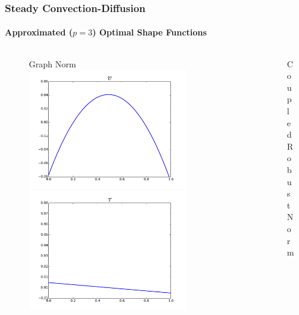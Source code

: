 \documentclass[18pt,xcolor=table]{beamer}
\begin{document}
\begin{frame}[t]
\frametitle{Steady Convection-Diffusion}
\framesubtitle{Approximated ($p=3$) Optimal Shape Functions}
\vspace{-3ex}
\begin{columns}
\begin{column}{0.5\textwidth}
\begin{figure}[t]
\centering
Graph Norm
\includegraphics[width=0.8\textwidth]{OptimalTestFunctions/uLinear_1e-2/steady/graph_steady_v_approx3.pdf}\\
\includegraphics[width=0.8\textwidth]{OptimalTestFunctions/uLinear_1e-2/steady/graph_steady_tau_approx3.pdf}
\end{figure}
\end{column}
\begin{column}{0.5\textwidth}
\begin{figure}[t]
\centering
Coupled Robust Norm

\end{figure}
\end{column}
\end{columns}
\end{frame}
\end{document}
